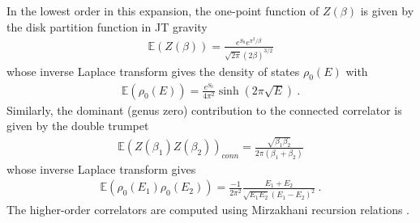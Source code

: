 \documentclass[a4paper,11pt]{article}
\theoremstyle{definition}
\numberwithin{equation}{section}
\begin{document}
In the lowest order in this expansion, the one-point function of $Z(\beta)$ is given by the disk partition function in JT gravity \cite{cotler2017black,kitaev2019statistical,yang2019quantum}
\begin{eqnarray}
\mathbb{E}(Z(\beta))=\frac{e^{S_0}e^{\pi^2/\beta}}{\sqrt{2\pi}(2\beta)^{3/2}}
\end{eqnarray}
 whose inverse Laplace transform gives the density of states $\rho_0(E)$ with
\begin{eqnarray}\label{equation:spectraldensity}
    \mathbb{E}(\rho_0(E))=\frac{e^{S_0}}{4\pi^2}\sinh(2\pi\sqrt{E})\ .
\end{eqnarray}
Similarly, the dominant (genus zero) contribution to the connected correlator is given by the double trumpet
\begin{eqnarray}
    \mathbb{E}(Z(\beta_1)Z(\beta_2))_{conn}=\frac{\sqrt{\beta_1\beta_2}}{2\pi(\beta_1+\beta_2)}
\end{eqnarray}
whose inverse Laplace transform gives
\begin{eqnarray}
    \mathbb{E}(\rho_0(E_1)\rho_0(E_2))=\frac{-1}{2\pi^2}\frac{E_1+E_2}{\sqrt{E_1E_2}(E_1-E_2)^2}\ .
\end{eqnarray}
The higher-order correlators are computed using Mirzakhani recursion relations \cite{saad2019jt}.
 
\end{document}
